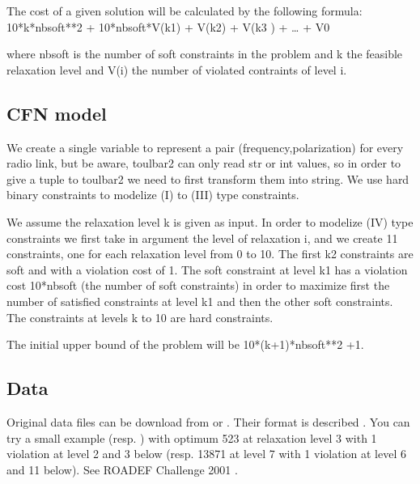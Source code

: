 \documentclass[letterpaper,10pt,openany,oneside,english]{sphinxmanual}
\let\sphinxpxdimen\pdfpxdimen\else\newdimen\sphinxpxdimen
\begin{document}
\sphinxAtStartPar
The cost of a given solution will be calculated by the following formula: 10*k*nbsoft**2 + 10*nbsoft*V(k\sphinxhyphen{}1) + V(k\sphinxhyphen{}2) + V(k\sphinxhyphen{}3    ) + … + V0

\sphinxAtStartPar
where  nbsoft is the number of soft constraints in the problem and k the feasible relaxation level and V(i) the number of violated contraints of level i.

\noindent\sphinxincludegraphics[height=250\sphinxpxdimen]{{fapp}.png}


\subsection{CFN model}
\label{\detokenize{examples/tuto_fapwp:cfn-model}}
\sphinxAtStartPar
We create a single variable to represent a pair (frequency,polarization) for every radio link, but be aware, toulbar2 can only read str or int values, so in order to give a tuple to toulbar2 we need to first transform them into string. We use hard binary constraints to modelize (I) to (III) type constraints.

\sphinxAtStartPar
We assume the relaxation level k is given as input. In order to modelize (IV) type constraints we first take in argument the level of relaxation i, and we create 11 constraints, one for each relaxation level from 0 to 10. The first k\sphinxhyphen{}2 constraints are soft and with a violation cost of 1.
The soft constraint at level k\sphinxhyphen{}1 has a violation cost 10*nbsoft (the number of soft constraints) in order to maximize first the number of satisfied constraints at level k\sphinxhyphen{}1 and then the other soft constraints.
The constraints at levels k to 10 are hard constraints.

\sphinxAtStartPar
The initial upper bound of the problem will be 10*(k+1)*nbsoft**2 +1.


\subsection{Data}
\label{\detokenize{examples/tuto_fapwp:data}}
\sphinxAtStartPar
Original data files can be download from  or . Their format is described . You can try a small example  (resp. ) with optimum 523 at relaxation level 3 with 1 violation at level 2 and 3 below (resp. 13871 at level 7 with 1 violation at level 6 and 11 below). See ROADEF Challenge 2001 .
\end{document}
